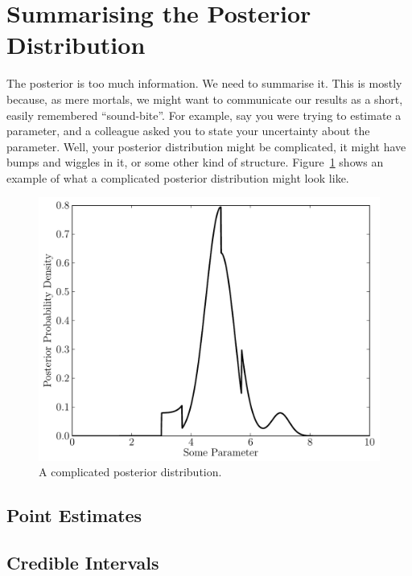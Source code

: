\section{Summarising the Posterior Distribution}
The posterior is too much information. We need to summarise it. This is mostly
because, as mere mortals, we might want to communicate our results as a short,
easily remembered ``sound-bite''. For example, say you were trying to estimate
a parameter, and a colleague asked you to state your uncertainty about the
parameter. Well, your posterior distribution might be complicated, it might
have bumps and wiggles in it, or some other kind of structure.
Figure~\ref{fig:complicated_posterior} shows an example of what a complicated
posterior distribution might look like.
\begin{figure}[h!]
\begin{center}
\includegraphics[scale=0.6]{Figures/complicated_posterior.pdf}
\caption{A complicated posterior distribution.\label{fig:complicated_posterior}}
\end{center}
\end{figure}

\subsection{Point Estimates}


\subsection{Credible Intervals}



